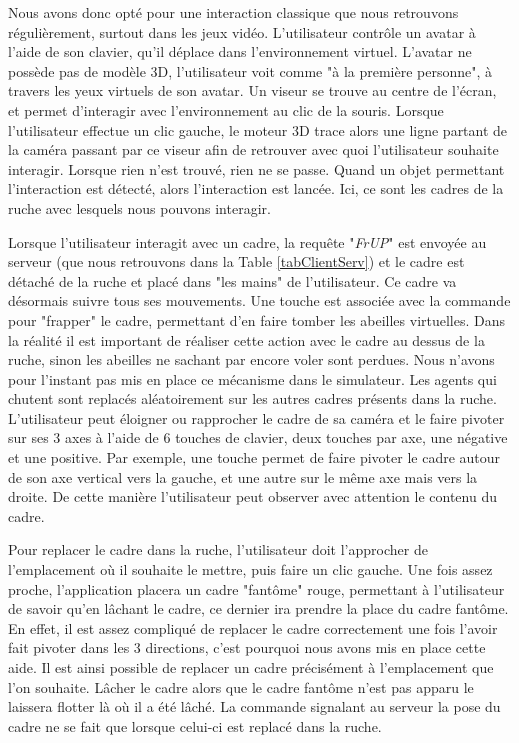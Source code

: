 		Nous avons donc opté pour une interaction classique que nous retrouvons régulièrement, surtout dans les jeux vidéo. L'utilisateur contrôle un avatar à l'aide de son clavier, qu'il déplace dans l'environnement virtuel. L'avatar ne possède pas de modèle 3D, l'utilisateur voit comme "à la première personne", à travers les yeux virtuels de son avatar. Un viseur se trouve au centre de l'écran, et permet d'interagir avec l'environnement au clic de la souris. Lorsque l'utilisateur effectue un clic gauche, le moteur 3D trace alors une ligne partant de la caméra passant par ce viseur afin de retrouver avec quoi l'utilisateur souhaite interagir. Lorsque rien n'est trouvé, rien ne se passe. Quand un objet permettant l'interaction est détecté, alors l'interaction est lancée. Ici, ce sont les cadres de la ruche avec lesquels nous pouvons interagir.
		
		Lorsque l'utilisateur interagit avec un cadre, la requête "\textit{FrUP}" est envoyée au serveur (que nous retrouvons dans la Table \ref{tabClientServ}) et le cadre est détaché de la ruche et placé dans "les mains" de l'utilisateur. Ce cadre va désormais suivre tous ses mouvements. Une touche est associée avec la commande pour "frapper" le cadre, permettant d'en faire tomber les abeilles virtuelles. Dans la réalité il est important de réaliser cette action avec le cadre au dessus de la ruche, sinon les abeilles ne sachant par encore voler sont perdues. Nous n'avons pour l'instant pas mis en place ce mécanisme dans le simulateur. Les agents qui chutent sont replacés aléatoirement sur les autres cadres présents dans la ruche.
		L'utilisateur peut éloigner ou rapprocher le cadre de sa caméra et le faire pivoter sur ses 3 axes à l'aide de 6 touches de clavier, deux touches par axe, une négative et une positive. Par exemple, une touche permet de faire pivoter le cadre autour de son axe vertical vers la gauche, et une autre sur le même axe mais vers la droite. De cette manière l'utilisateur peut observer avec attention le contenu du cadre.
		
		Pour replacer le cadre dans la ruche, l'utilisateur doit l'approcher de l'emplacement où il souhaite le mettre, puis faire un clic gauche. Une fois assez proche, l'application placera un cadre "fantôme" rouge, permettant à l'utilisateur de savoir qu'en lâchant le cadre, ce dernier ira prendre la place du cadre fantôme. En effet, il est assez compliqué de replacer le cadre correctement une fois l'avoir fait pivoter dans les 3 directions, c'est pourquoi nous avons mis en place cette aide. Il est ainsi possible de replacer un cadre précisément à l'emplacement que l'on souhaite. Lâcher le cadre alors que le cadre fantôme n'est pas apparu le laissera flotter là où il a été lâché. La commande signalant au serveur la pose du cadre ne se fait que lorsque celui-ci est replacé dans la ruche.
		
